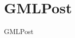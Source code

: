 \documentclass{beamer}
\begin{document}
\section{GMLPost}
\begin{frame}{GMLPost}
\end{frame}





\end{document}
